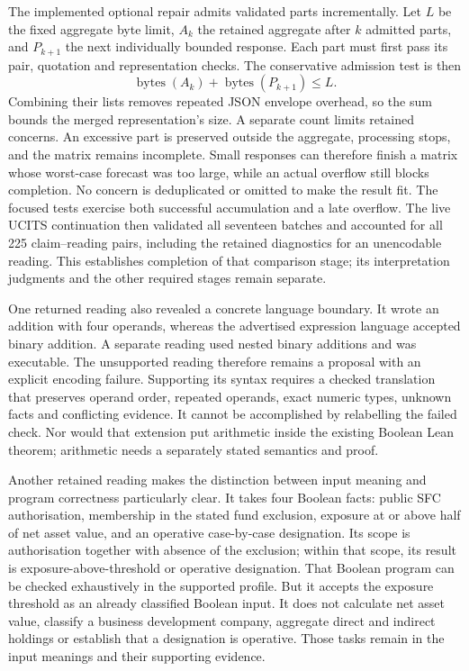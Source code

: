 The implemented optional repair admits validated parts incrementally. Let $L$ be the fixed
aggregate byte limit, $A_k$ the retained aggregate after $k$ admitted parts, and
$P_{k+1}$ the next individually bounded response. Each part must first pass its
pair, quotation and representation checks. The conservative admission test is
then
\[
  \operatorname{bytes}(A_k)+\operatorname{bytes}(P_{k+1})\leq L.
\]
Combining their lists removes repeated JSON envelope overhead, so the sum bounds
the merged representation's size. A separate count limits retained concerns.
An excessive part is preserved outside the aggregate, processing stops, and the
matrix remains incomplete. Small responses can therefore finish a matrix whose
worst-case forecast was too large, while an actual overflow still blocks
completion. No concern is deduplicated or omitted to make the result fit.
The focused tests exercise both successful accumulation and a late overflow.
The live UCITS continuation then validated all seventeen batches and accounted
for all 225 claim--reading pairs, including the retained diagnostics for an
unencodable reading. This establishes completion of that comparison stage;
its interpretation judgments and the other required stages remain separate.

One returned reading also revealed a concrete language boundary. It wrote an
addition with four operands, whereas the advertised expression language
accepted binary addition. A separate reading used nested binary additions and
was executable. The unsupported reading therefore remains a proposal with an
explicit encoding failure. Supporting its syntax requires a checked translation
that preserves operand order, repeated operands, exact numeric types, unknown
facts and conflicting evidence. It cannot be accomplished by relabelling the
failed check. Nor would that extension put arithmetic inside the existing
Boolean Lean theorem; arithmetic needs a separately stated semantics and proof.

Another retained reading makes the distinction between input meaning and
program correctness particularly clear. It takes four Boolean facts: public
SFC authorisation, membership in the stated fund exclusion, exposure at or above
half of net asset value, and an operative case-by-case designation. Its scope is
authorisation together with absence of the exclusion; within that scope, its
result is exposure-above-threshold or operative designation. That Boolean
program can be checked exhaustively in the supported profile. But it accepts
the exposure threshold as an already classified Boolean input. It does not
calculate net asset value, classify a business development company, aggregate
direct and indirect holdings or establish that a designation is operative.
Those tasks remain in the input meanings and their supporting evidence.

